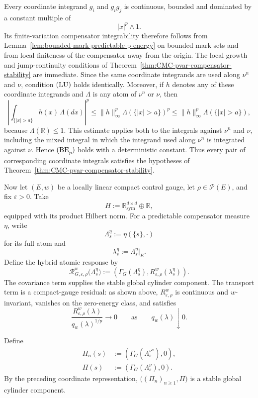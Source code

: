 \documentclass[a4paper,10pt]{article}
\begin{document}
Every coordinate integrand \(g_i\) and \(g_ig_j\) is continuous,
bounded and dominated by a constant multiple of
\[
        |x|^p\wedge1.
\]
Its finite-variation compensator integrability therefore follows from
Lemma~\ref{lem:bounded-mark-predictable-p-energy} on bounded mark sets
and from local finiteness of the compensator away from the origin.
The local growth and jump-continuity conditions of
Theorem~\ref{thm:CMC-pvar-compensator-stability} are immediate. Since
the same coordinate integrands are used along \(\nu^n\) and \(\nu\),
condition \({\rm (LU)}\) holds identically. Moreover, if \(h\) denotes
any of these coordinate integrands and
\(\Lambda\) is any atom of \(\nu^n\) or \(\nu\), then
\[
\left|
\int_{\{|x|>a\}}h(x)\,\Lambda(dx)
\right|^p
\le
\lVert h\rVert_\infty^p
\Lambda(\{|x|>a\})^p
\le
\lVert h\rVert_\infty^p
\Lambda(\{|x|>a\}),
\]
because \(\Lambda(\mathbb R)\le1\). This estimate applies both to the
integrals against \(\nu^n\) and \(\nu\), including the mixed integral
in which the integrand used along \(\nu^n\) is integrated against
\(\nu\). Hence \({\rm (BE}_p{\rm )}\) holds with a deterministic constant.
Thus every pair of corresponding coordinate integrals satisfies the
hypotheses of
Theorem~\ref{thm:CMC-pvar-compensator-stability}.

Now let \((E,w)\) be a locally linear compact control gauge, let
\(\rho\in\mathcal P(E)\), and fix \(\varepsilon>0\). Take
\[
        H
        :=
        \mathbb R_{\mathrm{sym}}^{d\times d}
        \oplus\mathbb R,
\]
equipped with its product Hilbert norm. For a predictable compensator
measure \(\eta\), write
\[
        \Lambda_s^\eta
        :=
        \eta(\{s\},\cdot)
\]
for its full atom and
\[
        \lambda_s^\eta
        :=
        \Lambda_s^\eta|_E.
\]
Define the hybrid atomic response by
\[
\mathcal R_{G,\varepsilon,\rho}^w
\bigl(\Lambda_s^\eta\bigr)
:=
\left(
        \Gamma_G(\Lambda_s^\eta),
        R_{\varepsilon,\rho}^w(\lambda_s^\eta)
\right).
\]
The covariance term supplies the stable global cylinder component. The
transport term is a compact-gauge residual: as shown above,
\(R_{\varepsilon,\rho}^w\) is continuous and \(w\)-invariant, vanishes
on the zero-energy class, and satisfies
\[
\frac{
R_{\varepsilon,\rho}^w(\lambda)
}{
q_w(\lambda)^{1/p}
}
\longrightarrow0
\qquad\text{as}\qquad
q_w(\lambda)\downarrow0.
\]

Define
\[
\begin{aligned}
\Pi_n(s)
&:=
\left(
        \Gamma_G(\Lambda_s^{\nu^n}),0
\right),
\\
\Pi(s)
&:=
\left(
        \Gamma_G(\Lambda_s^\nu),0
\right).
\end{aligned}
\]
By the preceding coordinate representation,
$
        \bigl((\Pi_n)_{n\ge1},\Pi\bigr)
$
is a stable global cylinder component.
\end{document}

